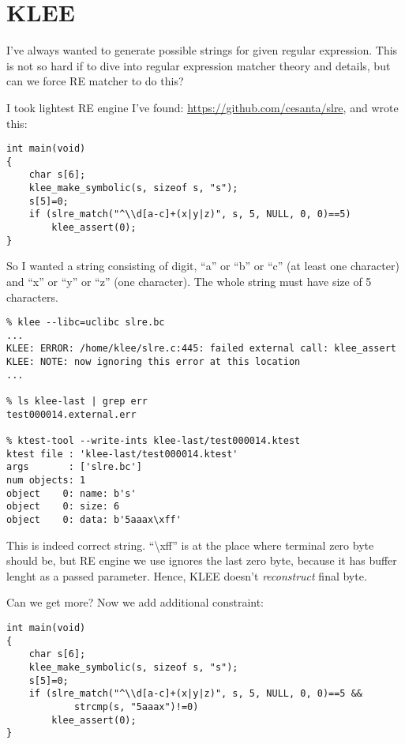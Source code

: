 \section{KLEE}

I've always wanted to generate possible strings for given regular expression.
This is not so hard if to dive into regular expression matcher theory and details, but can we force RE matcher to do this?

I took lightest RE engine I've found: \url{https://github.com/cesanta/slre}, and wrote this:

\begin{lstlisting}
int main(void)
{
	char s[6];
	klee_make_symbolic(s, sizeof s, "s");
	s[5]=0;
	if (slre_match("^\\d[a-c]+(x|y|z)", s, 5, NULL, 0, 0)==5)
		klee_assert(0);
}
\end{lstlisting}

So I wanted a string consisting of digit, ``a'' or ``b'' or ``c'' (at least one character) and ``x'' or ``y'' or ``z'' (one character).
The whole string must have size of 5 characters.

\begin{lstlisting}
% klee --libc=uclibc slre.bc
...
KLEE: ERROR: /home/klee/slre.c:445: failed external call: klee_assert
KLEE: NOTE: now ignoring this error at this location
...

% ls klee-last | grep err
test000014.external.err

% ktest-tool --write-ints klee-last/test000014.ktest
ktest file : 'klee-last/test000014.ktest'
args       : ['slre.bc']
num objects: 1
object    0: name: b's'
object    0: size: 6
object    0: data: b'5aaax\xff'
\end{lstlisting}

This is indeed correct string. ``\textbackslash{}xff'' is at the place where terminal zero byte should be, but RE engine we use ignores the last zero byte, because it has buffer lenght as a passed parameter.
Hence, KLEE doesn't \emph{reconstruct} final byte.

Can we get more?
Now we add additional constraint:

\begin{lstlisting}
int main(void)
{
	char s[6];
	klee_make_symbolic(s, sizeof s, "s");
	s[5]=0;
	if (slre_match("^\\d[a-c]+(x|y|z)", s, 5, NULL, 0, 0)==5 &&
			strcmp(s, "5aaax")!=0)
		klee_assert(0);
}
\end{lstlisting}

